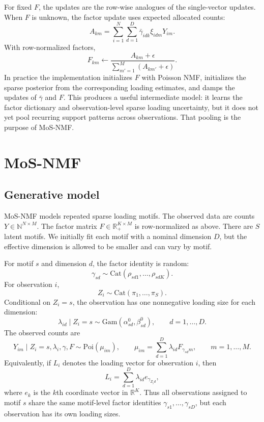 \documentclass[11pt]{article}
\newcommand{\N}{\mathbb{N}}
\newcommand{\R}{\mathbb{R}}
\newcommand{\Poi}{\mathrm{Poi}}
\newcommand{\Gam}{\mathrm{Gam}}
\newcommand{\Cat}{\mathrm{Cat}}
\theoremstyle{definition}
\begin{document}
For fixed $F$, the updates are the row-wise analogues of the single-vector
updates. When $F$ is unknown, the factor update uses expected allocated counts:
\[
  A_{km}
  =
  \sum_{i=1}^N \sum_{d=1}^D
  \bar{\gamma}_{idk}\xi_{idm}Y_{im}.
\]
With row-normalized factors,
\[
  F_{km}
  \leftarrow
  \frac{A_{km}+\epsilon}
       {\sum_{m'=1}^M(A_{km'}+\epsilon)}.
\]
In practice the implementation initializes $F$ with Poisson NMF, initializes
the sparse posterior from the corresponding loading estimates, and damps the
updates of $\bar{\gamma}$ and $F$. This produces a useful intermediate model:
it learns the factor dictionary and observation-level sparse loading
uncertainty, but it does not yet pool recurring support patterns across
observations. That pooling is the purpose of MoS-NMF.

\section{MoS-NMF}
\label{sec:mos-nmf}

\subsection{Generative model}

MoS-NMF models repeated sparse loading motifs. The observed data are counts
$Y \in \N^{N \times M}$. The factor matrix
$F \in \R_+^{K \times M}$ is row-normalized as above. There are $S$ latent
motifs. We initially fit each motif with a
nominal dimension $D$, but the effective dimension is allowed to be smaller and
can vary by motif.

For motif $s$ and dimension $d$, the factor identity is random:
\[
  \gamma_{sd}
  \sim
  \Cat(\rho_{sd1},\ldots,\rho_{sdK}).
\]
For observation $i$,
\[
  Z_i \sim \Cat(\pi_1,\ldots,\pi_S).
\]
Conditional on $Z_i=s$, the observation has one nonnegative loading size for
each dimension:
\[
  \lambda_{id}\mid Z_i=s
  \sim
  \Gam(\alpha_{sd}^0,\beta_{sd}^0),
  \qquad d=1,\ldots,D.
\]
The observed counts are
\[
  Y_{im}\mid Z_i=s,\lambda_i,\gamma,F
  \sim
  \Poi(\mu_{im}),
  \qquad
  \mu_{im} =
  \sum_{d=1}^D \lambda_{id}F_{\gamma_{sd}m},
  \qquad m=1,\ldots,M.
\]
Equivalently, if $L_i$ denotes the loading vector for observation $i$, then
\[
  L_i
  =
  \sum_{d=1}^D \lambda_{id} e_{\gamma_{Z_i d}},
\]
where $e_k$ is the $k$th coordinate vector in $\R^K$. Thus all observations
assigned to motif $s$ share the same motif-level factor identities
$\gamma_{s1},\ldots,\gamma_{sD}$, but each observation has its own loading
sizes.
\end{document}
